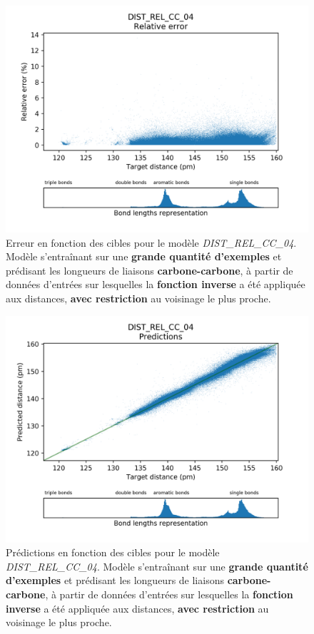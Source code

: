\begin{figure}[!h]
	\centering
	
	\includegraphics[scale=0.75]{../figures/DIST_REL_CC_04/DIST_REL_CC_04_distrib_rmse_dist.png}	
	
	\caption{Erreur en fonction des cibles pour le modèle \emph{DIST\_REL\_CC\_04}. Modèle s'entraînant sur une \textbf{grande quantité d'exemples} et prédisant les longueurs de liaisons \textbf{carbone-carbone}, à partir de données d'entrées sur lesquelles la \textbf{fonction inverse} a été appliquée aux distances, \textbf{avec restriction} au voisinage le plus proche.}
\end{figure}

\begin{figure}[!h]
	\centering
	
	\includegraphics[scale=0.75]{../figures/DIST_REL_CC_04/DIST_REL_CC_04_preds_targets.png}	
	
	\caption{Prédictions en fonction des cibles pour le modèle \emph{DIST\_REL\_CC\_04}. Modèle s'entraînant sur une \textbf{grande quantité d'exemples} et prédisant les longueurs de liaisons \textbf{carbone-carbone}, à partir de données d'entrées sur lesquelles la \textbf{fonction inverse} a été appliquée aux distances, \textbf{avec restriction} au voisinage le plus proche.}
	
\end{figure}


